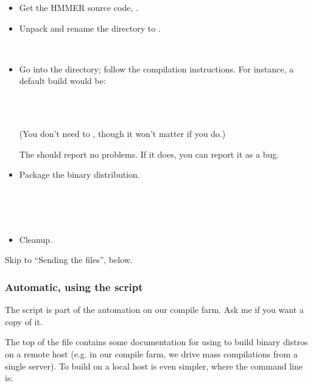 \begin{itemize}
\item Get the HMMER source code, .

\item Unpack and rename the directory to .

\\

\item Go into the  directory; follow the compilation
   instructions. For instance, a default build would be:

\\
\\

(You don't need to , though it won't matter if you
do.)

The  should report no problems. If it does, you can
report it as a bug.

\item Package the binary distribution.

\\
\\
\\

\item Cleanup. 

\end{itemize}


Skip to ``Sending the files'', below.


\subsubsection{Automatic, using the  script}

The  script is part of the automation on our compile
farm.  Ask me if you want a copy of it.

The top of the  file contains some documentation for
using  to build binary distros on a remote host
(e.g. in our compile farm, we drive mass compilations from a single
server).  To build on a local host is even simpler, where the command
line is:

